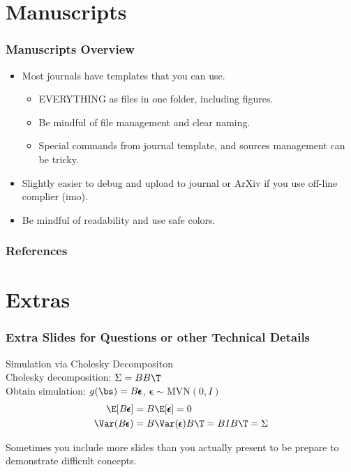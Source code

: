 \documentclass[serif,12pt, aspectratio=169]{beamer}
\begin{document}
\section{Manuscripts}
\begin{frame}
	\frametitle{Manuscripts Overview}
	\begin{itemize}
		\item Most journals have templates that you can use.
		\begin{itemize}
			\item EVERYTHING as files in one folder, including figures. 
			\item Be mindful of file management and clear naming. 
			\item Special commands from journal template, and sources management can be tricky. 
		\end{itemize}
		\item Slightly easier to debug and upload to journal or ArXiv if you use off-line complier (imo). 
		\item Be mindful of readability and use safe colors. 
	\end{itemize}
\end{frame}

\begin{frame}
\frametitle{References}
	\AtNextBibliography{\tiny}
	\printbibliography
\end{frame}



\section*{Extras}
\begin{frame}
	\frametitle{Extra Slides for Questions or other Technical Details}
	Simulation via Cholesky Decompositon \\
	Cholesky decomposition: $\Sigma = BB\T$ \\
	Obtain simulation: $g(\bs) = B\pmb{\epsilon}$, $\pmb{\epsilon} \sim \text{MVN}(0,I)$
	\begin{align*}
	\E[B\pmb{\epsilon}] &= B \E[\pmb{\epsilon}] = 0 \\
	\Var(B\pmb{\epsilon}) &= B \Var(\pmb{\epsilon}) B\T = B I B\T = \Sigma
	\end{align*} 
	
	Sometimes you include more slides than you actually present to be prepare to demonstrate difficult concepts. 
\end{frame}
\end{document}

